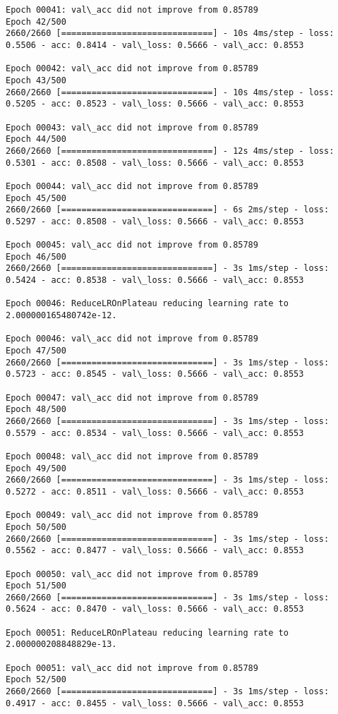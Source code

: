 \documentclass[11pt]{article}
\begin{document}
\begin{Verbatim}[commandchars=\\\{\}]
Epoch 00041: val\_acc did not improve from 0.85789
Epoch 42/500
2660/2660 [==============================] - 10s 4ms/step - loss: 0.5506 - acc: 0.8414 - val\_loss: 0.5666 - val\_acc: 0.8553

Epoch 00042: val\_acc did not improve from 0.85789
Epoch 43/500
2660/2660 [==============================] - 10s 4ms/step - loss: 0.5205 - acc: 0.8523 - val\_loss: 0.5666 - val\_acc: 0.8553

Epoch 00043: val\_acc did not improve from 0.85789
Epoch 44/500
2660/2660 [==============================] - 12s 4ms/step - loss: 0.5301 - acc: 0.8508 - val\_loss: 0.5666 - val\_acc: 0.8553

Epoch 00044: val\_acc did not improve from 0.85789
Epoch 45/500
2660/2660 [==============================] - 6s 2ms/step - loss: 0.5297 - acc: 0.8508 - val\_loss: 0.5666 - val\_acc: 0.8553

Epoch 00045: val\_acc did not improve from 0.85789
Epoch 46/500
2660/2660 [==============================] - 3s 1ms/step - loss: 0.5424 - acc: 0.8538 - val\_loss: 0.5666 - val\_acc: 0.8553

Epoch 00046: ReduceLROnPlateau reducing learning rate to 2.000000165480742e-12.

Epoch 00046: val\_acc did not improve from 0.85789
Epoch 47/500
2660/2660 [==============================] - 3s 1ms/step - loss: 0.5723 - acc: 0.8545 - val\_loss: 0.5666 - val\_acc: 0.8553

Epoch 00047: val\_acc did not improve from 0.85789
Epoch 48/500
2660/2660 [==============================] - 3s 1ms/step - loss: 0.5579 - acc: 0.8534 - val\_loss: 0.5666 - val\_acc: 0.8553

Epoch 00048: val\_acc did not improve from 0.85789
Epoch 49/500
2660/2660 [==============================] - 3s 1ms/step - loss: 0.5272 - acc: 0.8511 - val\_loss: 0.5666 - val\_acc: 0.8553

Epoch 00049: val\_acc did not improve from 0.85789
Epoch 50/500
2660/2660 [==============================] - 3s 1ms/step - loss: 0.5562 - acc: 0.8477 - val\_loss: 0.5666 - val\_acc: 0.8553

Epoch 00050: val\_acc did not improve from 0.85789
Epoch 51/500
2660/2660 [==============================] - 3s 1ms/step - loss: 0.5624 - acc: 0.8470 - val\_loss: 0.5666 - val\_acc: 0.8553

Epoch 00051: ReduceLROnPlateau reducing learning rate to 2.000000208848829e-13.

Epoch 00051: val\_acc did not improve from 0.85789
Epoch 52/500
2660/2660 [==============================] - 3s 1ms/step - loss: 0.4917 - acc: 0.8455 - val\_loss: 0.5666 - val\_acc: 0.8553


\end{Verbatim}
\end{document}
